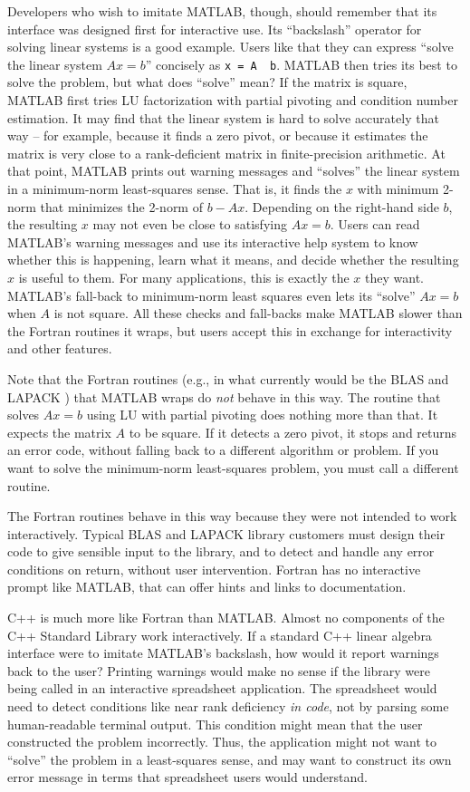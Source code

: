 Developers who wish to imitate MATLAB, though, should remember that
its interface was designed first for interactive use.  Its
``backslash'' operator for solving linear systems is a good example.
Users like that they can express ``solve the linear system $Ax=b$''
concisely as \texttt{x = A \ b}.  MATLAB then tries its best to solve
the problem, but what does ``solve'' mean?  If the matrix is square,
MATLAB first tries LU factorization with partial pivoting and
condition number estimation.  It may find that the linear system is
hard to solve accurately that way -- for example, because it finds a
zero pivot, or because it estimates the matrix is very close to a
rank-deficient matrix in finite-precision arithmetic.  At that point,
MATLAB prints out warning messages and ``solves'' the linear system in
a minimum-norm least-squares sense.  That is, it finds the $x$ with
minimum 2-norm that minimizes the 2-norm of $b - Ax$.  Depending on
the right-hand side $b$, the resulting $x$ may not even be close to
satisfying $Ax = b$.  Users can read MATLAB's warning messages and use
its interactive help system to know whether this is happening, learn
what it means, and decide whether the resulting $x$ is useful to them.
For many applications, this is exactly the $x$ they want.  MATLAB's
fall-back to minimum-norm least squares even lets its ``solve'' $Ax=b$
when $A$ is not square.  All these checks and fall-backs make MATLAB
slower than the Fortran routines it wraps, but users accept this in
exchange for interactivity and other features.

Note that the Fortran routines (e.g., in what currently would be the
BLAS \cite{BLAS-standard} and LAPACK \cite{LAPACK-Users-Guide}) that
MATLAB wraps do \emph{not} behave in this way.  The routine that
solves $Ax=b$ using LU with partial pivoting does nothing more than
that.  It expects the matrix $A$ to be square.  If it detects a zero
pivot, it stops and returns an error code, without falling back to a
different algorithm or problem.  If you want to solve the minimum-norm
least-squares problem, you must call a different routine.

The Fortran routines behave in this way because they were not intended
to work interactively.  Typical BLAS and LAPACK library customers must
design their code to give sensible input to the library, and to detect
and handle any error conditions on return, without user intervention.
Fortran has no interactive prompt like MATLAB, that can offer hints
and links to documentation.

C++ is much more like Fortran than MATLAB.  Almost no components of
the C++ Standard Library work interactively.  If a standard C++ linear
algebra interface were to imitate MATLAB's backslash, how would it
report warnings back to the user?  Printing warnings would make no
sense if the library were being called in an interactive spreadsheet
application.  The spreadsheet would need to detect conditions like
near rank deficiency \emph{in code}, not by parsing some
human-readable terminal output.  This condition might mean that the
user constructed the problem incorrectly.  Thus, the application might
not want to ``solve'' the problem in a least-squares sense, and may
want to construct its own error message in terms that spreadsheet
users would understand.

